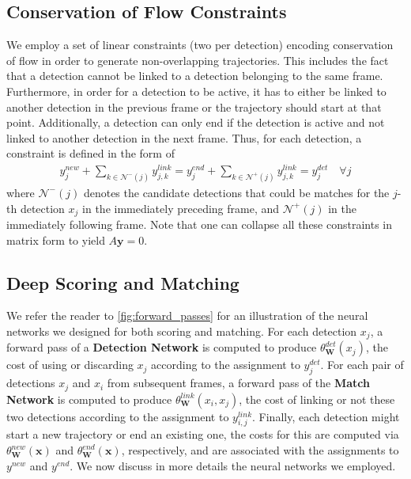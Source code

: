 \documentclass[letterpaper, 10 pt, conference]{ieeeconf}  \pdfminorversion=4
\newcommand{\binvar}{y}
\newcommand{\obsvarset}{\mathbf{x}}
\newcommand{\obsvar}{x}
\newcommand{\weightset}{\mathbf{W}}
\newcommand{\modelfun}{\theta}
\newcommand{\by}{\mathbf{y}}
\begin{document}
\subsection{Conservation of Flow Constraints}
We employ a set of linear constraints (two per detection) encoding  conservation of flow in order to generate non-overlapping trajectories. This includes the fact that a detection cannot be linked to a detection belonging to the same frame. Furthermore, in order for a detection to be active, it has to either be linked to another detection in the previous frame or the trajectory should start at that point. Additionally, a detection can only end if the detection is active and not linked to another detection in the next frame. Thus, for each detection, a constraint is defined in the form of
\begin{gather}
	\label{eq:constraints}
	\binvar^{new}_j + \sum_{k \in \mathcal{N^-}(j)} \binvar^{link}_{j,k} = \binvar^{end}_{j} + \sum_{k \in \mathcal{N^+}(j)} \binvar^{link}_{j,k} = \binvar^{det}_{j} \quad \forall j
\end{gather}
where $\mathcal{N^-}(j)$ denotes the candidate detections that could be matches for the $j$-th  detection $\obsvar_j$ in the immediately preceding frame, and  $\mathcal{N^+}(j)$ in the immediately following frame.
Note that one can collapse all these constraints in matrix form to yield  $A\by = 0$.



\subsection{Deep Scoring and Matching}
\label{sec:deep_scoring}

We refer the reader to \autoref{fig:forward_passes} for an illustration of the neural networks we designed for both scoring and matching. For each detection $\obsvar_j$, a forward pass of a \textbf{Detection Network} is computed to produce $\modelfun_\weightset^{det}(\obsvar_j)$, the cost of using or discarding $\obsvar_j$ according to the assignment to $y^{det}_j$. For each pair of detections $\obsvar_j$ and $\obsvar_i$ from subsequent frames, a forward pass of the \textbf{Match Network} is computed to produce $\modelfun_\weightset^{link}(\obsvar_i, \obsvar_j)$, the cost of linking or not these two detections according to the assignment to $y^{link}_{i,j}$. Finally, each detection might start a new trajectory or end an existing one, the costs for this are computed via $\modelfun_\weightset^{new}(\obsvarset)$ and $\modelfun_\weightset^{end}(\obsvarset)$, respectively, and are associated with the assignments to $y^{new}$ and $y^{end}$.
We now discuss in more details the neural networks we employed.
\end{document}
